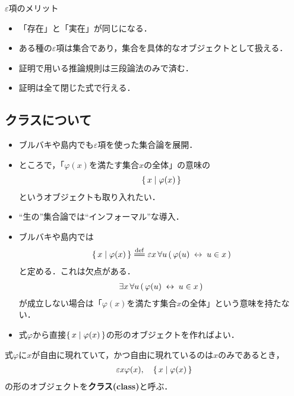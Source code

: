 	\begin{itembox}[l]{$\varepsilon$項のメリット}
		\begin{itemize}
			\item 「存在」と「実在」が同じになる．
			\item ある種の$\varepsilon$項は集合であり，集合を具体的なオブジェクトとして扱える．
			\item 証明で用いる推論規則は三段論法のみで済む．
			\item 証明は全て閉じた式で行える．
		\end{itemize}
	\end{itembox}
	
\newpage
\subsection{クラスについて}
	\begin{itemize}
		\item ブルバキ\cite{}や島内\cite{}でも$\varepsilon$項を使った集合論を展開．
		
		\item ところで，「$\varphi(x)$を満たす集合$x$の全体」の意味の
			\begin{align}
				\left\{\, x \mid \varphi(x)\, \right\}
			\end{align}
			というオブジェクトも取り入れたい．
		
		\item ``生の''集合論では``インフォーマル''な導入．
		
		\item ブルバキ\cite{}や島内\cite{}では
			\begin{align}
				\Set{x}{\varphi(x)} \defeq \varepsilon x\, \forall u\, 
				(\, \varphi(u) \lrarrow u \in x\, )
			\end{align}
			と定める．これは欠点がある．
			\begin{align}
				\exists x\, \forall u\, (\, \varphi(u) \hspace{0.25em}\leftrightarrow\hspace{0.25em} u \in x\, )
			\end{align}
			が成立しない場合は「$\varphi(x)$を満たす集合$x$の全体」という意味を持たない．
			
		\item 式$\varphi$から直接$\left\{\, x \mid \varphi(x)\, \right\}$の形のオブジェクトを作ればよい．
	\end{itemize}
	
\newpage
	\begin{screen}
		\begin{dfn}[クラス]
			式$\varphi$に$x$が自由に現れていて，かつ自由に現れているのは$x$のみであるとき，
			\begin{align}
				\varepsilon x \varphi(x), \quad \left\{\, x \mid \varphi(x)\, \right\}
			\end{align}
			の形のオブジェクトを{\bf クラス(class)}と呼ぶ．
		\end{dfn}
	\end{screen}
	
